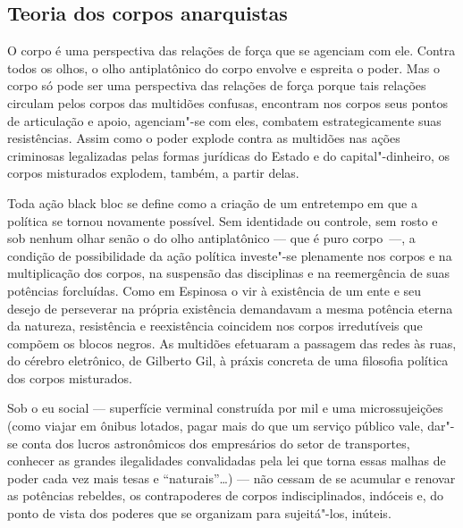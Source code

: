 \subsection{Teoria dos corpos anarquistas}

O corpo é uma perspectiva das
relações de força que se agenciam com ele. Contra todos os olhos, o olho
antiplatônico do corpo envolve e espreita o poder. Mas o corpo só pode
ser uma perspectiva das relações de força porque tais relações circulam
pelos corpos das multidões confusas, encontram nos corpos seus pontos de
articulação e apoio, agenciam"-se com eles, combatem estrategicamente
suas resistências. Assim como o poder explode contra as multidões nas
ações criminosas legalizadas pelas formas jurídicas do Estado e do
capital"-dinheiro, os corpos misturados explodem, também, a partir delas.

Toda ação black bloc se define como a criação de um entretempo em
que a política se tornou novamente possível. Sem identidade ou controle,
sem rosto e sob nenhum olhar senão o do olho antiplatônico --- que é puro
corpo~---, a condição de possibilidade da ação política investe"-se
plenamente nos corpos e na multiplicação dos corpos, na suspensão das
disciplinas e na reemergência de suas potências forcluídas. Como em
Espinosa o vir à existência de um ente e seu desejo de perseverar na
própria existência demandavam a mesma potência eterna da natureza,
resistência e reexistência coincidem nos corpos irredutíveis que compõem
os blocos negros. As multidões efetuaram a passagem das redes às ruas,
do cérebro eletrônico, de Gilberto Gil, à práxis concreta de uma
filosofia política dos corpos misturados.

Sob o eu social --- superfície verminal construída por mil e uma
microssujeições (como viajar em ônibus lotados, pagar mais do que um
serviço público vale, dar"-se conta dos lucros astronômicos dos
empresários do setor de transportes, conhecer as grandes ilegalidades
convalidadas pela lei que torna essas malhas de poder cada vez mais
tesas e ``naturais''\ldots{}) --- não cessam de se acumular e renovar as
potências rebeldes, os contrapoderes de corpos indisciplinados, indóceis
e, do ponto de vista dos poderes que se organizam para sujeitá"-los,
inúteis.

